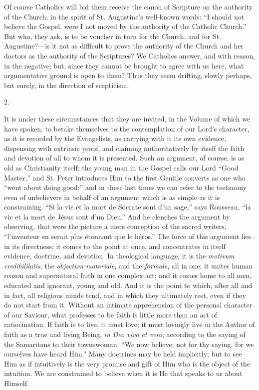 Of course Catholics will bid them receive the
canon of Scripture on the authority of the Church, in the spirit of
St. Augustine's well-known words: ``I should not believe the Gospel,
were I not moved by the authority of the Catholic Church.'' But who,
they ask, is to be voucher in turn for the Church, and for St.
Augustine?—is it not as difficult to prove the authority of the
Church and her doctors as the authority of the Scriptures? We
Catholics answer, and with reason, in the negative; but, since they
cannot be brought to agree with us here, what argumentative ground is
open to them? Thus they seem drifting, slowly perhaps, but surely, in
the direction of scepticism.

2.

It is under these circumstances that they are
invited, in the Volume of which we have spoken, to betake themselves
to the contemplation of our Lord's character, as it is recorded by the
Evangelists, as carrying with it its own evidence, dispensing with
extrinsic proof, and claiming authoritatively by itself the faith and
devotion of all to whom it is presented. Such an argument, of course,
is as old as Christianity itself; the young man in the Gospel calls
our Lord ``Good Master,'' and St. Peter introduces Him to the first
Gentile converts as one who ``went about doing good;'' and in these last
times we can refer to the testimony even of unbelievers in behalf of
an argument which is as simple as it is constraining. ``Si la vie et la
mort de Socrate sont d'un sage,'' says Rousseau, ``la vie et la mort de
Jésus sont d'un Dieu.'' And he clenches the argument by observing,
that were the picture a mere conception of the sacred writers, ``l'inventeur
en serait plus étonnant que le héros.'' The force of this argument
lies in its directness; it comes to the point at once, and
concentrates in itself evidence, doctrine, and devotion. In
theological language, it is the \emph{motivum credibililatis}, the \emph{objectum
materiale}, and the \emph{formale}, all in one; it unites human
reason and supernatural faith in one complex act; and it comes home to
all men, educated and ignorant, young and old. And it is the point to
which, after all and in fact, all religious minds tend, and in which
they ultimately rest, even if they do not start from it. Without an
intimate apprehension of the personal character of our Saviour, what
professes to be faith is little more than an act of ratiocination. If
faith is to live, it must love; it must lovingly live in the Author of
faith as a true and living Being, \emph{in Deo vivo et vero};
according to the saying of the Samaritans to their townswoman: ``We now
believe, not for thy saying, for we ourselves have heard Him.'' Many
doctrines may be held implicitly; but to see Him as if intuitively is
the very promise and gift of Him who is the object of the intuition.
We are constrained to believe when it is He that speaks to us about
Himself.

